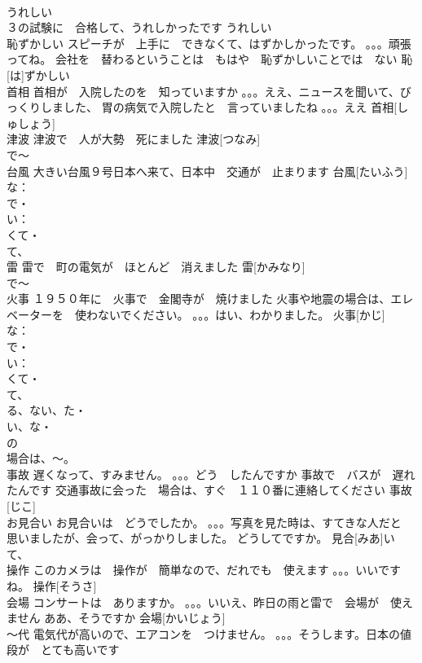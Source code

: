 \documentclass[8pt]{extreport}
\begin{document}
\begin{CJK}{UTF8}{min}
\\	うれしい	
\\	３の試験に　合格して、うれしかったです	うれしい			
\\	恥ずかしい	スピーチが　上手に　できなくて、はずかしかったです。 。。。頑張ってね。 会社を　替わるということは　もはや　恥ずかしいことでは　ない	恥[は]ずかしい			
\\	首相	首相が　入院したのを　知っていますか 。。。ええ、ニュースを聞いて、びっくりしました、 胃の病気で入院したと　言っていましたね 。。。ええ	首相[しゅしょう]					
\\	津波	津波で　人が大勢　死にました	津波[つなみ]				
\\	で～
\\	台風	大きい台風９号日本へ来て、日本中　交通が　止まります	台風[たいふう]				
\\	な：
\\	で・
\\	い： 
\\	くて・
\\	て、
\\	雷	雷で　町の電気が　ほとんど　消えました	雷[かみなり]			
\\	で～
\\	火事	１９５０年に　火事で　金閣寺が　焼けました 火事や地震の場合は、エレベーターを　使わないでください。 。。。はい、わかりました。	火事[かじ]			
\\	な：
\\	で・
\\	い： 
\\	くて・
\\	て、
\\	る、ない、た・
\\	い、な・
\\	の
\\	場合は、～。
\\	事故	遅くなって、すみません。 。。。どう　したんですか 事故で　バスが　遅れたんです 交通事故に会った　場合は、すぐ　１１０番に連絡してください	事故[じこ]					
\\	お見合い	お見合いは　どうでしたか。 。。。写真を見た時は、すてきな人だと　思いましたが、会って、がっかりしました。 どうしてですか。	見合[みあ]い			
\\	て、
\\	操作	このカメラは　操作が　簡単なので、だれでも　使えます 。。。いいですね。	操作[そうさ]			
\\	会場	コンサートは　ありますか。 。。。いいえ、昨日の雨と雷で　会場が　使えません ああ、そうですか	会場[かいじょう]					
\\	～代	電気代が高いので、エアコンを　つけません。 。。。そうします。日本の値段が　とても高いです	

\end{CJK}
\end{document}
